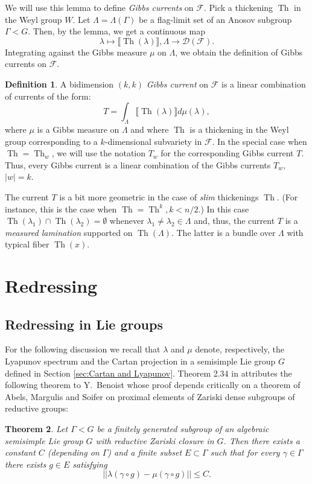 \documentclass[12pt]{amsbook}%
\newtheorem{thm}{Theorem}[chapter]
\theoremstyle{definition}
\newtheorem{defi}[thm]{Definition}
\theoremstyle{remark}
\numberwithin{section}{chapter}
\numberwithin{subsection}{section}
\numberwithin{figure}{chapter}
\DeclareMathOperator{\Th}{Th}
\def\cD{{\mathscr{D}}}
\def\cF{{\mathscr{F}}}
\def\Ga{\Gamma}
\def\La{\Lambda}
\def\la{\lambda}
\def\kap{}
\begin{document}
{{We will use this lemma to define {\em Gibbs currents} on $\cF$. Pick a thickening $\Th$ in the Weyl group $W$. Let $\La=\La(\Ga)$ be a 
flag-limit set of an Anosov subgroup $\Ga< G$. 
Then, by the lemma, 
we get a continuous map
$$
\la\mapsto \llbracket \Th(\la)\rrbracket, \La \to  \cD(\cF). 
$$
Integrating against the Gibbs measure $\mu$ on $\La$,
 we obtain the definition of  Gibbs currents on $\cF$. 
 
 \begin{defi} \label{defi_Gibbs_current} A bidimension $(k,k)$ {\em Gibbs current} on $\cF$ is a linear combination of currents of the form: 
 $$T=\int_\La \llbracket \Th(\la) \rrbracket d\mu(\la),$$
 where $\mu$ is a Gibbs measure on $\Lambda$ and where $\Th$ is a thickening in the Weyl group corresponding to a $k$-dimensional subvariety in $\cF$. 
 In the special case when $\Th=\Th_w$, we will use the notation $T_w$ for the corresponding Gibbs current $T$. Thus, every Gibbs current is a linear combination of the 
 Gibbs currents $T_w$, $|w|=k$. 
 \end{defi}


The current $T$ is a bit more geometric in the case of {\em slim} thickenings $\Th$. 
(For instance, this is the case when $\Th=\Th^k, k< n/2$.)
In this case $\Th(\la_1)\cap \Th(\la_2)=\emptyset$ 
whenever $\la_1\ne \la_2\in \La$ and, thus, the current $T$ is a {\em measured lamination} supported on $\Th(\La)$. The latter is a bundle over $\La$ with 
typical fiber $\Th(x)$. 

\section{Redressing}

\subsection{Redressing in Lie groups} 


For the following discussion we recall that $\lambda$ and $\mu$ denote, respectively, the Lyapunov spectrum and the Cartan projection in a semisimple Lie group $G$ defined in Section \ref{sec:Cartan and Lyapunov}.  
Theorem 2.34 in \cite{GGKW} attributes the following theorem to Y.~Benoist \cite{Benoist} whose proof depends critically on a theorem of Abels, Margulis and Soifer \cite{AMS} on proximal elements of Zariski dense subgroups of reductive groups:

\begin{thm}\label{thm:GGKW}
Let $\Ga< G$ be a finitely generated subgroup of an algebraic semisimple Lie group $G$ with reductive Zariski closure in $G$. Then there exists a constant $C$ (depending on $\Ga$) and a finite subset $E\subset \Gamma$ such that for every $\gamma\in \Gamma$ there exists $g\in E$ satisfying 
$$
||\lambda(\gamma\circ g)- \mu(\gamma\circ g)||\leqslant C.
$$
\end{thm}

}}
\end{document}
